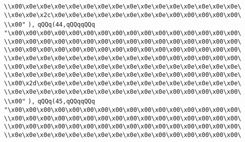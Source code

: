 \verb|\\x00\x0e\x0e\x0e\x0e\x0e\x0e\x0e\x0e\x0e\x0e\x0e\x0e\x0e\x0e\x0e\|\newline
\verb|\\x0e\x0e\x2c\x0e\x0e\x0e\x0e\x0e\x0e\x0e\x0e\x00\x00\x00\x00\x00\|\newline
\verb|\\x00"|\newline
\verb|),|\newline
\verb|qQQq(44,qQQqqQQq|\newline
\verb|"\x00\x00\x00\x00\x00\x00\x00\x00\x00\x00\x00\x00\x00\x00\x00\x00\|\newline
\verb|\\x00\x00\x00\x00\x00\x00\x00\x00\x00\x00\x00\x00\x00\x00\x00\x00\|\newline
\verb|\\x00\x00\x00\x00\x00\x00\x00\x00\x00\x00\x00\x00\x00\x00\x00\x00\|\newline
\verb|\\x0e\x0e\x0e\x0e\x0e\x0e\x0e\x0e\x0e\x0e\x00\x00\x00\x00\x00\x00\|\newline
\verb|\\x00\x0e\x0e\x0e\x0e\x0e\x0e\x0e\x0e\x0e\x0e\x0e\x0e\x0e\x0e\x0e\|\newline
\verb|\\x0e\x0e\x0e\x0e\x0e\x0e\x0e\x0e\x0e\x0e\x0e\x00\x00\x00\x00\x0e\|\newline
\verb|\\x00\x2d\x0e\x0e\x0e\x0e\x0e\x0e\x0e\x0e\x0e\x0e\x0e\x0e\x0e\x0e\|\newline
\verb|\\x0e\x0e\x0e\x0e\x0e\x0e\x0e\x0e\x0e\x0e\x0e\x00\x00\x00\x00\x00\|\newline
\verb|\\x00"|\newline
\verb|),|\newline
\verb|qQQq(45,qQQqqQQq|\newline
\verb|"\x00\x00\x00\x00\x00\x00\x00\x00\x00\x00\x00\x00\x00\x00\x00\x00\|\newline
\verb|\\x00\x00\x00\x00\x00\x00\x00\x00\x00\x00\x00\x00\x00\x00\x00\x00\|\newline
\verb|\\x00\x00\x00\x00\x00\x00\x00\x00\x00\x00\x00\x00\x00\x00\x00\x00\|\newline
\verb|\\x0e\x0e\x0e\x0e\x0e\x0e\x0e\x0e\x0e\x0e\x00\x00\x00\x00\x00\x00\|\newline
